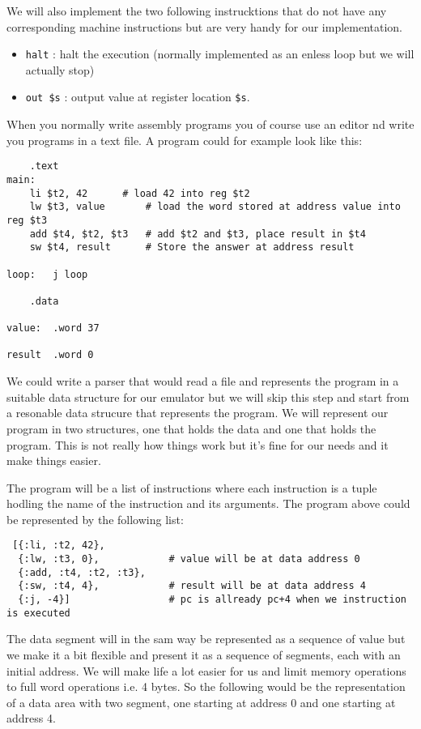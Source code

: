 \documentclass[a4paper,11pt]{article}
\begin{document}
We will also implement the two following instrucktions that do not
have any corresponding machine instructions but are very handy for our
implementation.

\begin{itemize}
\item {\tt halt} : halt the execution (normally implemented as an enless loop but we will actually stop)
\item {\tt out \$s} : output value at register location {\tt \$s}.
\end{itemize}

When you normally write assembly programs you of course use an editor
nd write you programs in a text file. A program could for example
look like this:


\begin{verbatim}
	.text 	
main:
	li $t2, 42		# load 42 into reg $t2 
	lw $t3, value		# load the word stored at address value into reg $t3
	add $t4, $t2, $t3	# add $t2 and $t3, place result in $t4
	sw $t4, result		# Store the answer at address result

loop:   j loop

	.data

value:	.word 37

result 	.word 0
\end{verbatim}

We could write a parser that would read a file and represents the
program in a suitable data structure for our emulator but we will skip
this step and start from a resonable data strucure that represents the
program. We will represent our program in two structures, one that
holds the data and one that holds the program. This is not really how
things work but it's fine for our needs and it make things easier.

The program will be a list of instructions where each instruction is a
tuple hodling the name of the instruction and its arguments. The
program above could be represented by the following list:

\begin{verbatim}
 [{:li, :t2, 42},
  {:lw, :t3, 0},            # value will be at data address 0
  {:add, :t4, :t2, :t3},
  {:sw, :t4, 4},            # result will be at data address 4
  {:j, -4}]                 # pc is allready pc+4 when we instruction is executed
\end{verbatim}

The data segment will in the sam way be represented as a sequence of
value but we make it a bit flexible and present it as a sequence of
segments, each with an initial address. We will make life a lot easier
for us and limit memory operations to full word operations i.e. 4
bytes. So the following would be the representation of a data area
with two segment, one starting at address 0 and one starting at
address 4.
\end{document}
